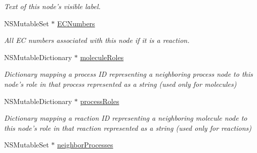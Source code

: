 \begin{DoxyCompactItemize}
\begin{DoxyCompactList}\small\item\em Text of this node's visible label. \end{DoxyCompactList}\item 
\hypertarget{interface_p_c_node_info_adf0f47d07246a08774d048e91b437c1a}{
NSMutableSet $\ast$ \hyperlink{interface_p_c_node_info_adf0f47d07246a08774d048e91b437c1a}{ECNumbers}}
\label{interface_p_c_node_info_adf0f47d07246a08774d048e91b437c1a}

\begin{DoxyCompactList}\small\item\em All EC numbers associated with this node if it is a reaction. \end{DoxyCompactList}\item 
\hypertarget{interface_p_c_node_info_a5c552237386a73eb818c61a15a09204a}{
NSMutableDictionary $\ast$ \hyperlink{interface_p_c_node_info_a5c552237386a73eb818c61a15a09204a}{moleculeRoles}}
\label{interface_p_c_node_info_a5c552237386a73eb818c61a15a09204a}

\begin{DoxyCompactList}\small\item\em Dictionary mapping a process ID representing a neighboring process node to this node's role in that process represented as a string (used only for molecules) \end{DoxyCompactList}\item 
\hypertarget{interface_p_c_node_info_a260be1282a2ffc89518aa23275a46f15}{
NSMutableDictionary $\ast$ \hyperlink{interface_p_c_node_info_a260be1282a2ffc89518aa23275a46f15}{processRoles}}
\label{interface_p_c_node_info_a260be1282a2ffc89518aa23275a46f15}

\begin{DoxyCompactList}\small\item\em Dictionary mapping a reaction ID representing a neighboring molecule node to this node's role in that reaction represented as a string (used only for reactions) \end{DoxyCompactList}\item 
\hypertarget{interface_p_c_node_info_a27b4e76d752731c7cf93ddee4698f740}{
NSMutableSet $\ast$ \hyperlink{interface_p_c_node_info_a27b4e76d752731c7cf93ddee4698f740}{neighborProcesses}}
\label{interface_p_c_node_info_a27b4e76d752731c7cf93ddee4698f740}


\end{DoxyCompactItemize}
